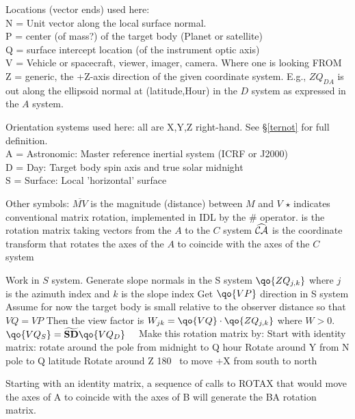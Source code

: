 \documentclass{article}
\begin{document}
\vspace{2.mm}
Locations (vector ends) used here:
\\ N = Unit vector along the local surface normal.
\\ P = center (of mass?) of the target body (Planet or satellite)
\\ Q = surface intercept location (of the instrument optic axis)
\\ V = Vehicle or spacecraft, viewer, imager, camera. Where one is looking FROM
\\ Z = generic, the +Z-axis direction of the given coordinate system.
\qi E.g., $ZQ_{DA}$ is out along the ellipsoid normal at (latitude,Hour) in the $D$ system as expressed in the $A$ system.  
 
\vspace{2.mm}
Orientation systems used here: all are X,Y,Z right-hand. See \S \ref{ternot} for full definition.
\\ A = Astronomic: Master reference inertial system (ICRF or J2000)
\\ D = Day:        Target body spin axis and true solar midnight
\\ S = Surface:    Local 'horizontal' surface

\vspace{2.mm}
Other symbols:
\qi $\overline{MV}$ is the magnitude (distance) between $M$ and $V$
\qi $\star$ indicates conventional matrix rotation, implemented in IDL by the \#
 operator.
\qi {} is the rotation matrix taking vectors from the $A$ to the $C$ system
\qi  $\widehat {\mathcal{CA}}$ is the coordinate transform that rotates the axes of the $A$ to 
coincide with the axes of the $C$ system

\vspace{2.mm}
Work in $S$ system. Generate slope normals in the S system $\qo{ZQ_{j,k}}$ where $j$ is the azimuth index and $k$ is the slope index
\qi Get $\qo{VP}  $ direction in S system
\qii Assume for now the target body is small relative to the observer distance so that $VQ=VP$ 
\qi Then the view factor is   $W_{jk}=\qo{VQ} \cdot \qo{ZQ_{j,k}} $ where $W > 0$.
\qi $\qo{VQ_S} = \qrm{SD} \qo{VQ_D}$   \ \ Make this rotation matrix by:
\qii Start with identity matrix: rotate around the pole from midnight to Q hour
\qii Rotate around Y from N pole to Q latitude
\qii Rotate around Z 180\qd~ to move +X from south to north

 Starting with an identity matrix, a sequence of calls to ROTAX that would move the
 axes of A to coincide with the axes of B will generate the BA rotation matrix.
\end{document}
